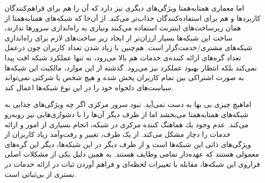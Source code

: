 \documentclass[12pt,twoside]{xepersian-magazine}
\begin{document}
\begin{article}{2}
اما معماری همتابه‌همتا ويژگی‌های ديگری نيز دارد که آن را هم برای فراهم‌کنندگان کاربردها و هم برای استفاده‌کنندگان جذاب‌تر می‌کند.  از آن‌جا که شبکه‌های همتابه‌همتا از همان زيرساخت‌های اينترنت استفاده می‌کنند ونيازی به راه‌اندازی سرورها ندارند، ساخت اين شبكه‌ها بسيار ارزان‌تر از ايجاد زير ساخت‌های لازم برای راه‌اندازی شبكه‌های مشتری/خدمت‌گزار است.  هم‌چنين با زياد شدن تعداد کاربران چون درعمل تعداد گره‌های ارائه کننده‌ی خدمات هم بالا می‌رود، نه تنها عملكرد شبكه افت پيدا نمی‌كند بلكه انتظار بهبود عملکرد نيز می‌رود. گذشته از اين موارد، مالكيت اين شبكه‌ها به صورت اشتراكی بين تمام کاربران پخش شده و هيچ شخص يا شركتی نمی‌تواند سياست‌های دلخواه خود را در اين نوع شبكه‌ها اعمال کند.

اماهيچ چيزی بی‌ بها به دست نمی‌آید. نبود سرور مرکزی اگر چه  ويژگی‌های جذابی به شبکه‌های همتابه‌همتا می‌بخشد اما از طرف ديگر آن‌ها را با دشواری‌هايی نيز روبه‌رو می‌کند.  عدم وجود يك هماهنگ كننده مركزی در شبكه، انجام بسياری از امور و ارائه خدمات را  دچار مشكل می‌کند.  از يک طرف، تغيير و رفت‌وآمد زیاد کاربران از ويژگی‌های ذاتی اين شبکه‌ها است و از طرف ديگر در اين شبكه‌ها، ديگر اين گره‌های معمولی  هستند كه  عهده‌دار تمامی وظايف هستند. به همين دلیل يکی از مشکلات اصلی فراروی اين شبكه‌ها، مقابله با  تغييرات لحظه‌ای و فراهم آوردن ثبات در ارائه  خدمات در بستری از بی‌ثباتی است.  
\end{article}

\articlesep

\end{document}
